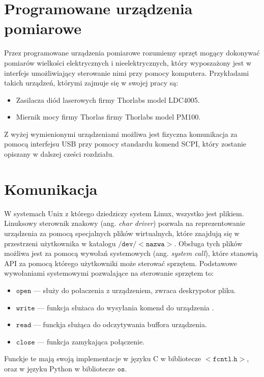 \section{Programowane urządzenia pomiarowe}
Przez  programowane urządzenia pomiarowe rozumiemy sprzęt mogący dokonywać pomiarów wielkości elektrycznych i nieelektrycznych,
 który wyposzażony jest w interfejs umożliwiający sterowanie nimi przy pomocy komputera. Przykładami takich urządzeń, którymi zajmuje się w swojej pracy są:
\begin{itemize}
\item Zasilacza diód laserowych firmy Thorlabs model LDC4005.
\item Miernik mocy firmy Thorlas firmy Thorlabs model PM100.
\end{itemize}
Z wyżej wymienionymi urządzeniami możliwa jest fizyczna komunikacja za pomocą interfejsu USB przy pomocy standardu komend SCPI,
 który zostanie opiszany w dalszej cześci rozdziału.

\section{Komunikacja}
W systemach Unix z którego dziedziczy system Linux, wszystko jest plikiem. Linuksowy sterownik znakowy (ang. \textit{char driver})
 pozwala na reprezentowanie urządzenia za pomocą specjalnych plików wirtualnych, które znajdują się w przestrzeni
 użytkownika w katalogu $\mathtt{/dev/<nazwa>}$. Obsługa tych plików możliwa jest za pomocą wywołań systemowych (ang. \textit{system call}),
  które stanowią API za pomocą którego użytkowniki może sterować sprzętem. Podstawowe wywołaniami systemowymi pozwalające na sterowanie sprzętem to:
\begin{itemize}
\item $\mathtt{open}$ --- służy do połaczenia z urządzeniem, zwraca deskrypotor pliku.
\item $\mathtt{write}$ --- funkcja służaca do wysyłania komend do urządzenia .
\item $\mathtt{read}$ --- funckja służąca do odczytywania buffora urządzenia.
\item $\mathtt{close}$ --- funkcja zamykająca połączenie.
\end{itemize}
Funckje te mają swoją implementacje w języku C w bibliotecze $<\mathtt{fcntl.h}>$, oraz w języku Python w bibliotecze $\mathtt{os}$.

